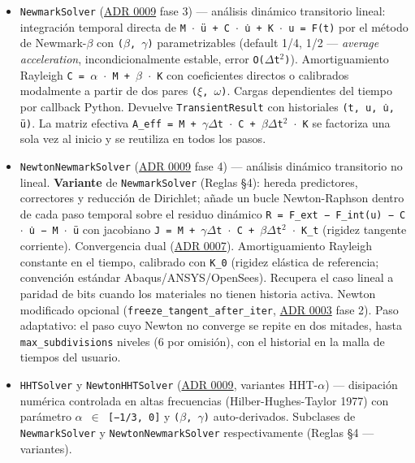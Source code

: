 \documentclass[11pt,oneside]{report}
\begin{document}
\begin{itemize}
  \item \texttt{NewmarkSolver} (\hyperref[adr:0009]{ADR 0009} fase 3) --- análisis dinámico transitorio lineal: integración temporal directa de \texttt{M \ensuremath{\cdot} ü + C \ensuremath{\cdot} u̇ + K \ensuremath{\cdot} u = F(t)} por el método de Newmark-\ensuremath{\beta} con \texttt{(\ensuremath{\beta}, \ensuremath{\gamma})} parametrizables (default 1/4, 1/2 --- \textit{average acceleration}, incondicionalmente estable, error \texttt{O(\ensuremath{\Delta}t\ensuremath{^{2}})}). Amortiguamiento Rayleigh \texttt{C = \ensuremath{\alpha} \ensuremath{\cdot} M + \ensuremath{\beta} \ensuremath{\cdot} K} con coeficientes directos o calibrados modalmente a partir de dos pares \texttt{(\ensuremath{\xi}, \ensuremath{\omega})}. Cargas dependientes del tiempo por callback Python. Devuelve \texttt{TransientResult} con historiales \texttt{(t, u, u̇, ü)}. La matriz efectiva \texttt{A\_\allowbreak{}eff = M + \ensuremath{\gamma}\ensuremath{\Delta}t \ensuremath{\cdot} C + \ensuremath{\beta}\ensuremath{\Delta}t\ensuremath{^{2}} \ensuremath{\cdot} K} se factoriza una sola vez al inicio y se reutiliza en todos los pasos.
  \item \texttt{NewtonNewmarkSolver} (\hyperref[adr:0009]{ADR 0009} fase 4) --- análisis dinámico transitorio no lineal. \textbf{Variante} de \texttt{NewmarkSolver} (Reglas §4): hereda predictores, correctores y reducción de Dirichlet; añade un bucle Newton-Raphson dentro de cada paso temporal sobre el residuo dinámico \texttt{R = F\_\allowbreak{}ext − F\_\allowbreak{}int(u) − C \ensuremath{\cdot} u̇ − M \ensuremath{\cdot} ü} con jacobiano \texttt{J = M + \ensuremath{\gamma}\ensuremath{\Delta}t \ensuremath{\cdot} C + \ensuremath{\beta}\ensuremath{\Delta}t\ensuremath{^{2}} \ensuremath{\cdot} K\_\allowbreak{}t} (rigidez tangente corriente). Convergencia dual (\hyperref[adr:0007]{ADR 0007}). Amortiguamiento Rayleigh constante en el tiempo, calibrado con \texttt{K\_0} (rigidez elástica de referencia; convención estándar Abaqus/ANSYS/OpenSees). Recupera el caso lineal a paridad de bits cuando los materiales no tienen historia activa. Newton modificado opcional (\texttt{freeze\_\allowbreak{}tangent\_\allowbreak{}after\_\allowbreak{}iter}, \hyperref[adr:0003]{ADR 0003} fase 2). Paso adaptativo: el paso cuyo Newton no converge se repite en dos mitades, hasta \texttt{max\_subdivisions} niveles (6 por omisión), con el historial en la malla de tiempos del usuario.
  \item \texttt{HHTSolver} y \texttt{NewtonHHTSolver} (\hyperref[adr:0009]{ADR 0009}, variantes HHT-\ensuremath{\alpha}) --- disipación numérica controlada en altas frecuencias (Hilber-Hughes-Taylor 1977) con parámetro \texttt{\ensuremath{\alpha} \ensuremath{\in} [−1/3, 0]} y \texttt{(\ensuremath{\beta}, \ensuremath{\gamma})} auto-derivados. Subclases de \texttt{NewmarkSolver} y \texttt{NewtonNewmarkSolver} respectivamente (Reglas §4 --- variantes).

\end{itemize}
\end{document}
